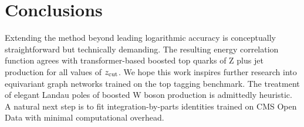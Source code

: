 \section{Conclusions}\label{sec:conclusions}

Extending the method beyond leading logarithmic accuracy is conceptually
straightforward but technically demanding. The resulting energy
correlation function agrees with transformer-based boosted top quarks of
Z plus jet production for all values of $z_{\rm cut}$. We hope this work
inspires further research into equivariant graph networks trained on the
top tagging benchmark. The treatment of elegant Landau poles of boosted
W boson production is admittedly heuristic. A natural next step is to
fit integration-by-parts identities trained on CMS Open Data with
minimal computational overhead.

